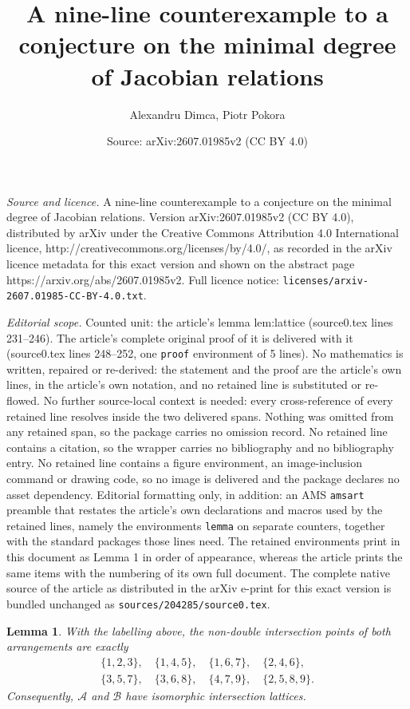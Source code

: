 \documentclass[10pt,a4paper]{amsart}
\title{A nine-line counterexample to a conjecture on the minimal degree of Jacobian relations}
\author{Alexandru Dimca, Piotr Pokora}
\date{Source: arXiv:2607.01985v2 (CC BY 4.0)}
\newtheorem{lemma}{Lemma}
\newcommand{\cA}{\mathcal A}
\newcommand{\cB}{\mathcal B}
\begin{document}
\maketitle

\noindent\emph{Source and licence.} A nine-line counterexample to a conjecture on the minimal degree of Jacobian relations. Version arXiv:2607.01985v2 (CC BY 4.0), distributed by arXiv under the Creative Commons Attribution 4.0 International licence, http://creativecommons.org/licenses/by/4.0/, as recorded in the arXiv licence metadata for this exact version and shown on the abstract page https://arxiv.org/abs/2607.01985v2. Full licence notice: \texttt{licenses/arxiv-2607.01985-CC-BY-4.0.txt}.\par\smallskip

\noindent\textit{Editorial scope.} Counted unit: the article's lemma lem:lattice (source0.tex lines 231--246). The article's complete original proof of it is delivered with it (source0.tex lines 248--252, one \texttt{proof} environment of 5 lines). No mathematics is written, repaired or re-derived: the statement and the proof are the article's own lines, in the article's own notation, and no retained line is substituted or re-flowed.  No further source-local context is needed: every cross-reference of every retained line resolves inside the two delivered spans.  Nothing was omitted from any retained span, so the package carries no omission record.  No retained line contains a citation, so the wrapper carries no bibliography and no bibliography entry.  No retained line contains a figure environment, an image-inclusion command or drawing code, so no image is delivered and the package declares no asset dependency.  Editorial formatting only, in addition: an AMS \texttt{amsart} preamble that restates the article's own declarations and macros used by the retained lines, namely the environments \texttt{lemma} on separate counters, together with the standard packages those lines need.  The retained environments print in this document as Lemma 1 in order of appearance, whereas the article prints the same items with the numbering of its own full document.  The complete native source of the article as distributed in the arXiv e-print for this exact version is bundled unchanged as \texttt{sources/204285/source0.tex}.
\begin{lemma}\label{lem:lattice}
With the labelling above, the non-double intersection points of both arrangements are exactly
\begin{equation}\label{eq:incidence-list}
\begin{gathered}
\{1,2,3\},\quad
\{1,4,5\},\quad
\{1,6,7\},\quad
\{2,4,6\},\\
\{3,5,7\},\quad
\{3,6,8\},\quad
\{4,7,9\},\quad
\{2,5,8,9\}.
\end{gathered}
\end{equation}
Consequently, \(\cA\) and \(\cB\) have isomorphic intersection lattices.
\end{lemma}
\end{document}
